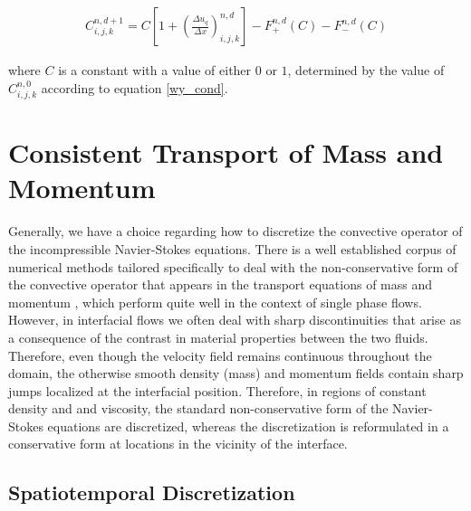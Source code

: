 \begin{align}
C_{i,j,k}^{n,d+1} =  C \left[1 + \left(\frac{\Delta u_q}{\Delta x}\right)^{n,d}_{i,j,k} \right] - F_{+}^{n,d}\left(C \right) - F_{-}^{n,d}\left(C \right)   
\label{wy_discrete}
\end{align}

where $C$ is a constant with a value of either $0$ or $1$, determined by the value of $C_{i,j,k}^{n,0}$ according to equation \ref{wy_cond}.  


\section{Consistent Transport of Mass and Momentum}

Generally, we have a choice regarding how to discretize 
the convective operator of the incompressible Navier-Stokes equations. 
There is a well established corpus of numerical methods tailored specifically 
to deal with the non-conservative  form of the convective 
operator that appears in the transport equations of mass and momentum 
, which perform quite well in the context of single phase flows.
However, in interfacial flows we often deal with sharp discontinuities that 
arise as a consequence of the contrast in material properties between the two fluids. 
Therefore, even though the velocity field remains continuous throughout the domain, 
the otherwise smooth density (mass) and momentum fields 
contain sharp jumps localized at the interfacial position.     
Therefore, in regions of constant density and and viscosity, the standard non-conservative
form of the Navier-Stokes equations are discretized, whereas the discretization is
reformulated in a conservative form at locations in the vicinity of the interface.  

\subsection*{Spatiotemporal Discretization}


